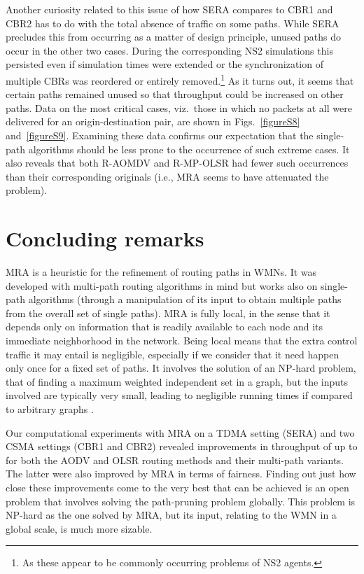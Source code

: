 \documentclass{article}
\begin{document}
Another curiosity related to this issue of how SERA compares to CBR1 and CBR2
has to do with the total absence of traffic on some paths. While SERA precludes
this from occurring as a matter of design principle, unused paths do occur in
the other two cases. During the corresponding NS2 simulations this persisted
even if simulation times were extended or the synchronization of multiple CBRs
was reordered or entirely removed.\footnote{As these appear to be commonly
occurring problems of NS2 agents.} As it turns out, it seems that certain paths
remained unused so that throughput could be increased on other paths. Data on
the most critical cases, viz.\ those in which no packets at all were delivered
for an origin-destination pair, are shown in Figs.~\ref{figureS8}
and~\ref{figureS9}. Examining these data confirms our expectation that the
single-path algorithms should be less prone to the occurrence of such extreme
cases. It also reveals that both R-AOMDV and R-MP-OLSR had fewer such
occurrences than their corresponding originals (i.e., MRA seems to have
attenuated the problem).

\section{Concluding remarks}\label{sec:conclusion}

MRA is a heuristic for the refinement of routing paths in WMNs. It was developed
with multi-path routing algorithms in mind but works also on single-path
algorithms (through a manipulation of its input to obtain multiple paths from
the overall set of single paths). MRA is fully local, in the sense that it
depends only on information that is readily available to each node and its
immediate neighborhood in the network. Being local means that the extra control
traffic it may entail is negligible, especially if we consider that it need
happen only once for a fixed set of paths. It involves the solution of an
NP-hard problem, that of finding a maximum weighted independent set in a graph,
but the inputs involved are typically very small, leading to negligible running
times if compared to arbitrary graphs \cite{Pardalos1991}.

Our computational experiments with MRA on a TDMA setting (SERA) and two CSMA
settings (CBR1 and CBR2) revealed improvements in throughput of up to  for
both the AODV and OLSR routing methods and their multi-path variants. The latter
were also improved by MRA in terms of fairness. Finding out just how close these
improvements come to the very best that can be achieved is an open problem that
involves solving the path-pruning problem globally. This problem is NP-hard as
the one solved by MRA, but its input, relating to the WMN in a global scale, is
much more sizable.
\end{document}
